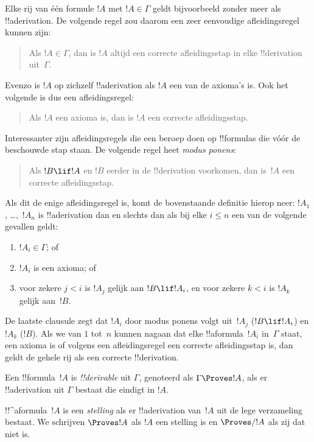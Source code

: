 \documentclass[openany]{memoir}
\begin{document}
Elke rij van één formule $!A$ met $!A \in \Gamma$ geldt bijvoorbeeld
zonder meer als !!a{derivation}. De volgende regel zou daarom een zeer
eenvoudige afleidingsregel kunnen zijn:
\begin{quote}
  Als $!A \in \Gamma$, dan is $!A$ altijd een correcte afleidingsstap
  in elke !!{derivation} uit~$\Gamma$.
\end{quote}
Evenzo is $!A$ op zichzelf !!a{derivation} als $!A$ een van de
axioma's is. Ook het volgende is dus een afleidingsregel:
\begin{quote}
  Als $!A$ een axioma is, dan is $!A$ een correcte afleidingsstap.
\end{quote}
Interessanter zijn afleidingsregels die een beroep doen op
!!{formula}s die vóór de beschouwde stap staan. De volgende regel heet
\emph{modus ponens}:
\begin{quote}
  Als $!B \lif !A$ en $!B$ eerder in de !!{derivation} voorkomen,
  dan is~$!A$ een correcte afleidingsstap.
\end{quote}
Als dit de enige afleidingsregel is, komt de bovenstaande definitie
hierop neer: $!A_1$, \dots,~$!A_n$ is !!a{derivation} dan en slechts
dan als bij elke $i \le n$ een van de volgende gevallen geldt:
\begin{enumerate}
\item $!A_i \in \Gamma$; of
\item $!A_i$ is een axioma; of
\item voor zekere $j < i$ is $!A_j$ gelijk aan $!B \lif !A_i$, en voor
  zekere $k < i$ is $!A_k$ gelijk aan~$!B$.
\end{enumerate}
De laatste clausule zegt dat $!A_i$ door modus ponens volgt
uit~$!A_j$ ($!B \lif !A_i$) en $!A_k$ ($!B$). Als we van $1$ tot~$n$
kunnen nagaan dat elke !!a{formula}~$!A_i$ in~$\Gamma$ staat, een
axioma is of volgens een afleidingsregel een correcte afleidingsstap
is, dan geldt de gehele rij als een correcte !!{derivation}.

\begin{defn}[!!^{derivability}]
Een !!{formula}~$!A$ is \emph{!!{derivable}} uit $\Gamma$, genoteerd
als $\Gamma \Proves !A$, als er !!a{derivation} uit $\Gamma$ bestaat
die eindigt in $!A$.
\end{defn}

\begin{defn}[Stellingen]
!!^a{formula}~$!A$ is een \emph{stelling} als er !!a{derivation}
van~$!A$ uit de lege verzameling bestaat. We schrijven $\Proves !A$
als $!A$ een stelling is en $\Proves/ !A$ als zij dat niet is.
\end{defn}
\endgroup
\end{document}
